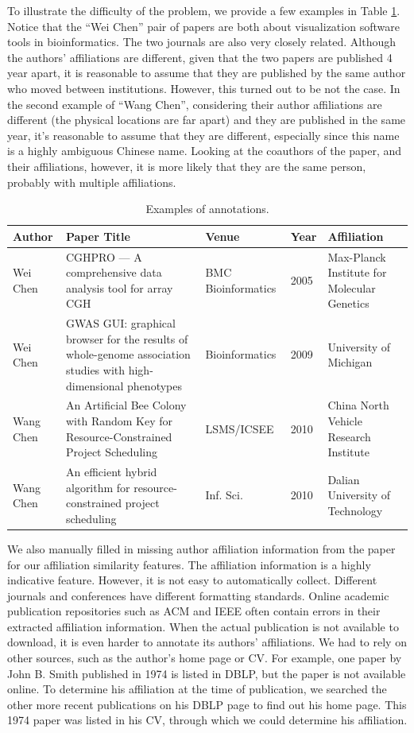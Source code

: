 \documentclass[twocolumn,letterpaper]{article}
\begin{document}
To illustrate the difficulty of the problem, we provide a few examples in Table \ref{tbl:examples}.  Notice that the ``Wei Chen'' pair of papers are both about visualization software tools in bioinformatics.  The two journals are also very closely related.  Although the authors' affiliations are different, given that the two papers are published 4 year apart, it is reasonable to assume that they are published by the same author who moved between institutions.  However, this turned out to be not the case.  In the second example of ``Wang Chen'', considering their author affiliations are different (the physical locations are far apart) and they are published in the same year, it's reasonable to assume that they are different, especially since this name is a highly ambiguous Chinese name.  Looking at the coauthors of the paper, and their affiliations, however, it is more likely that they are the same person, probably with multiple affiliations.
\begin{table}
  \centering
  \begin{tabular}{l|p{4cm}|l|l|p{4cm}}
    Author & Paper Title  & Venue & Year & Affiliation \\ \hline
    Wei Chen & CGHPRO --- A comprehensive data analysis tool for array CGH & BMC Bioinformatics & 2005 & Max-Planck Institute for Molecular Genetics \\
    Wei Chen & GWAS GUI: graphical browser for the results of whole-genome association studies with high-dimensional phenotypes & Bioinformatics & 2009 & University of Michigan \\ \hline
    Wang Chen & An Artificial Bee Colony with Random Key for Resource-Constrained Project Scheduling & LSMS/ICSEE & 2010 & China North Vehicle Research Institute \\
    Wang Chen & An efficient hybrid algorithm for resource-constrained project scheduling & Inf. Sci. & 2010 & Dalian University of Technology
  \end{tabular}
  \caption{Examples of annotations.}
  \label{tbl:examples}
\end{table}

We also manually filled in missing author affiliation information from the paper for our affiliation similarity features.  The affiliation information is a highly indicative feature.  However, it is not easy to automatically collect.  Different journals and conferences have different formatting standards.  Online academic publication repositories such as ACM and IEEE often contain errors in their extracted affiliation information.  When the actual publication is not available to download, it is even harder to annotate its authors' affiliations.  We had to rely on other sources, such as the author's home page or CV.  For example, one paper by John B. Smith published in 1974 is listed in DBLP, but the paper is not available online.  To determine his affiliation at the time of publication, we searched the other more recent publications on his DBLP page to find out his home page.  This 1974 paper was listed in his CV, through which we could determine his affiliation.
\end{document}
